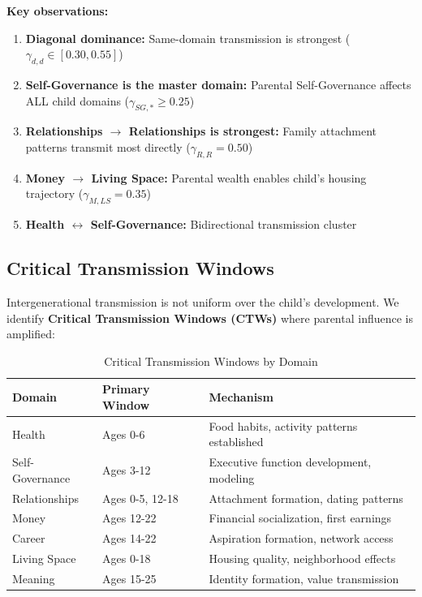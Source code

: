 \textbf{Key observations:}

\begin{enumerate}
\item \textbf{Diagonal dominance:} Same-domain transmission is strongest ($\gamma_{d,d} \in [0.30, 0.55]$)
\item \textbf{Self-Governance is the master domain:} Parental Self-Governance affects ALL child domains ($\gamma_{SG,*} \geq 0.25$)
\item \textbf{Relationships $\rightarrow$ Relationships is strongest:} Family attachment patterns transmit most directly ($\gamma_{R,R} = 0.50$)
\item \textbf{Money $\rightarrow$ Living Space:} Parental wealth enables child's housing trajectory ($\gamma_{M,LS} = 0.35$)
\item \textbf{Health $\leftrightarrow$ Self-Governance:} Bidirectional transmission cluster
\end{enumerate}

\subsection{Critical Transmission Windows}

Intergenerational transmission is not uniform over the child's development. We identify
\textbf{Critical Transmission Windows (CTWs)} where parental influence is amplified:

\begin{table}[htbp]
\centering
\caption{Critical Transmission Windows by Domain}
\label{tab:BI-windows}
\renewcommand{\arraystretch}{1.3}
\begin{tabular}{@{}lll@{}}
\toprule
\textbf{Domain} & \textbf{Primary Window} & \textbf{Mechanism} \\
\midrule
Health & Ages 0-6 & Food habits, activity patterns established \\
Self-Governance & Ages 3-12 & Executive function development, modeling \\
Relationships & Ages 0-5, 12-18 & Attachment formation, dating patterns \\
Money & Ages 12-22 & Financial socialization, first earnings \\
Career & Ages 14-22 & Aspiration formation, network access \\
Living Space & Ages 0-18 & Housing quality, neighborhood effects \\
Meaning & Ages 15-25 & Identity formation, value transmission \\
\bottomrule
\end{tabular}
\end{table}

